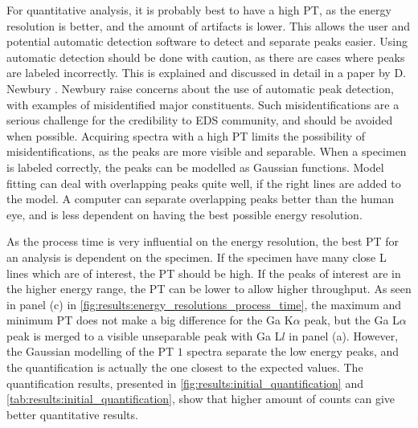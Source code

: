For quantitative analysis, it is probably best to have a high PT, as the energy resolution is better, and the amount of artifacts is lower.
This allows the user and potential automatic detection software to detect and separate peaks easier.
Using automatic detection should be done with caution, as there are cases where peaks are labeled incorrectly.
This is explained and discussed in detail in a paper by D. Newbury \cite{newbury_2005_misidentification}.
Newbury raise concerns about the use of automatic peak detection, with examples of misidentified major constituents.
Such misidentifications are a serious challenge for the credibility to EDS community, and should be avoided when possible.
Acquiring spectra with a high PT limits the possibility of misidentifications, as the peaks are more visible and separable.
When a specimen is labeled correctly, the peaks can be modelled as Gaussian functions.
Model fitting can deal with overlapping peaks quite well, if the right lines are added to the model.
A computer can separate overlapping peaks better than the human eye, and is less dependent on having the best possible energy resolution.

As the process time is very influential on the energy resolution, the best PT for an analysis is dependent on the specimen.
If the specimen have many close L lines which are of interest, the PT should be high.
If the peaks of interest are in the higher energy range, the PT can be lower to allow higher throughput.
As seen in panel (c) in \cref{fig:results:energy_resolutions_process_time}, the maximum and minimum PT does not make a big difference for the Ga K$\alpha$ peak, but the Ga L$\alpha$ peak is merged to a visible unseparable peak with Ga L$l$ in panel (a).
However, the Gaussian modelling of the PT $1$ spectra separate the low energy peaks, and the quantification is actually the one closest to the expected values.
The quantification results, presented in \cref{fig:results:initial_quantification} and \cref{tab:results:initial_quantification}, show that higher amount of counts can give better quantitative results.


